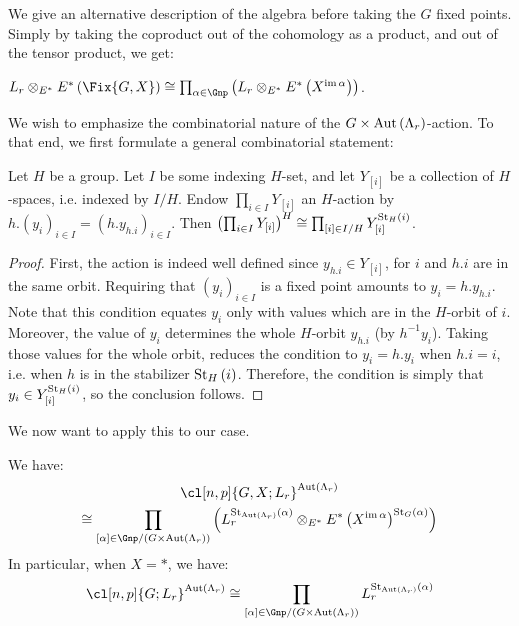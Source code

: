 We give an alternative description of the algebra before taking the $G$ fixed points.
Simply by taking the coproduct out of the cohomology as a product, and out of the tensor product, we get:

\begin{proposition}\label{Lr-Fix}
	$
	L_r \otimes_{E^*} E^*\left(\Fix{G,X}\right)
	\cong \prod_{\alpha \in \Gnp} \left(L_r \otimes_{E^*} E^*\left(X^{\im \alpha}\right)\right)
	$.
\end{proposition}

We wish to emphasize the combinatorial nature of the $G \times \operatorname{Aut} \left(\Lambda_r\right)$-action.
To that end, we first formulate a general combinatorial statement:

\begin{proposition}\label{combinatorial-situation}
	Let $H$ be a group.
	Let $I$ be some indexing $H$-set, and let $Y_{\left[i\right]}$ be a collection of $H$-spaces, i.e. indexed by $I/H$.
	Endow $\prod_{i \in I} Y_{\left[i\right]}$ an $H$-action by
	$
	h.\left(y_i\right)_{i \in I}
	= \left(h.y_{h.i}\right)_{i \in I}
	$.
	Then
	$
	\left(\prod_{i \in I} Y_{\left[i\right]}\right)^H
	\cong \prod_{\left[i\right] \in I/H} Y_{\left[i\right]}^{\operatorname{St}_H\left(i\right)}
	$.
\end{proposition}

\begin{proof}
	First, the action is indeed well defined since $y_{h.i} \in Y_{\left[i\right]}$, for $i$ and $h.i$ are in the same orbit.
	Requiring that $\left(y_i\right)_{i \in I}$ is a fixed point amounts to $y_i = h.y_{h.i}$.
	Note that this condition equates $y_i$ only with values which are in the $H$-orbit of $i$.
	Moreover, the value of $y_i$ determines the whole $H$-orbit $y_{h.i}$ (by $h^{-1} y_i$).
	Taking those values for the whole orbit, reduces the condition to $y_i = h. y_i$ when $h.i = i$, i.e. when $h$ is in the stabilizer $\operatorname{St}_H\left(i\right)$.
	Therefore, the condition is simply that $y_i \in Y_{\left[i\right]}^{\operatorname{St}_H\left(i\right)}$, so the conclusion follows.
\end{proof}

We now want to apply this to our case.

\begin{proposition}\label{combinatorial-cl-fixed}
	We have:
	\begin{multline*}
		\cl[n,p]{G,X; L_r}^{\aut \left(\Lambda_r\right)}\\
		\cong \prod_{\left[\alpha\right] \in \Gnp/{\left(G \times \aut \left(\Lambda_r\right)\right)}}
		\left(
		L_r^{\stab_{\aut \left(\Lambda_r\right)}\left(\alpha\right)}
		\otimes_{E^*} E^*\left(X^{\im \alpha}\right)^{\stab_G\left(\alpha\right)}
		\right)
	\end{multline*}
	In particular, when $X = *$, we have:
	$$
	\cl[n,p]{G; L_r}^{\aut \left(\Lambda_r\right)}
	\cong \prod_{\left[\alpha\right] \in \Gnp/{\left(G \times \aut \left(\Lambda_r\right)\right)}}
	L_r^{\stab_{\aut \left(\Lambda_r\right)}\left(\alpha\right)}
	$$
\end{proposition}

